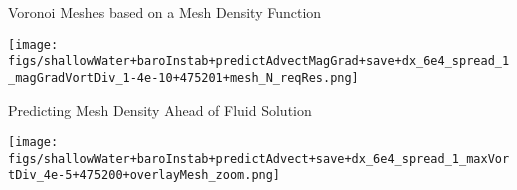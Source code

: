 \begin{slide}
{
    Voronoi Meshes based on a Mesh Density Function
}

\texttt{[image: figs/shallowWater+baroInstab+predictAdvectMagGrad+save+dx\_6e4\_spread\_1\_magGradVortDiv\_1-4e-10+475201+mesh\_N\_reqRes.png]}

\end{slide}

\begin{slide}
{
    Predicting Mesh Density Ahead of Fluid Solution
}

\texttt{[image: figs/shallowWater+baroInstab+predictAdvect+save+dx\_6e4\_spread\_1\_maxVortDiv\_4e-5+475200+overlayMesh\_zoom.png]}

\end{slide}

